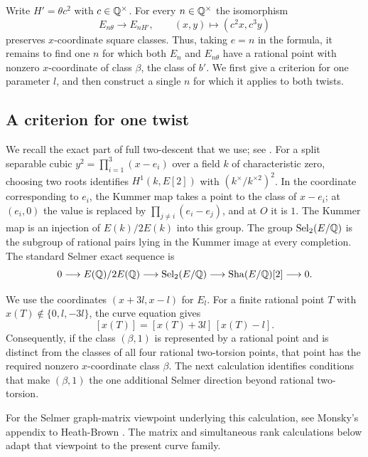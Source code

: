 Write $H'=\theta c^2$ with $c\in\mathbb Q^\times$. For every $n\in\mathbb Q^\times$
the isomorphism
\begin{equation}\label{par:twist-scaling}
 E_{n\theta}\longrightarrow E_{nH'},\qquad
 (x,y)\longmapsto(c^2x,c^3y)
\end{equation}
preserves $x$-coordinate square classes. Thus, taking $e=n$ in the
formula, it remains to find one $n$ for which both $E_n$ and
$E_{n\theta}$ have a rational point with nonzero $x$-coordinate of class
$\beta$, the class of $b'$. We first give a criterion for one parameter
$l$, and then construct a single $n$ for which it applies to both twists.

\subsection{A criterion for one twist}

We recall the exact part of full two-descent that we use; see
\cite[Chapter~X, Proposition~1.4, p.~315]{Silverman2009}. For a split
separable cubic $y^2=\prod_{i=1}^3(x-e_i)$ over a field $k$ of
characteristic zero, choosing two roots identifies
$H^1(k,E[2])$ with $(k^\times/k^{\times2})^2$. In the coordinate
corresponding to $e_i$, the Kummer map takes a point to the class
of $x-e_i$; at $(e_i,0)$ the value is replaced by
$\prod_{j\ne i}(e_i-e_j)$, and at $O$ it is $1$.
The Kummer map is an injection of $E(k)/2E(k)$ into this group.
The group $\operatorname{Sel}_2(E/\mathbb Q)$ is the subgroup of rational pairs lying
in the Kummer image at every completion. The standard Selmer exact
sequence \cite[Chapter~X, Theorem~4.2, p.~333]{Silverman2009} is
\begin{equation}\label{par:selmer-exact-sequence}
 0\longrightarrow E(\mathbb Q)/2E(\mathbb Q)
 \longrightarrow\operatorname{Sel}_2(E/\mathbb Q)
 \longrightarrow\mathop{\mathrm{Sha}}(E/\mathbb Q)[2]\longrightarrow0.
\end{equation}


We use the coordinates $(x+3l,x-l)$ for $E_l$. For a finite rational
point $T$ with $x(T)\notin\{0,l,-3l\}$, the curve equation gives
\[
             [x(T)]=[x(T)+3l]\,[x(T)-l].
\]
Consequently, if the class $(\beta,1)$ is represented by a rational
point and is distinct from the classes of all four rational two-torsion
points, that point has the required nonzero $x$-coordinate class $\beta$.
The next calculation identifies conditions that make $(\beta,1)$ the
one additional Selmer direction beyond rational two-torsion.

For the Selmer graph-matrix viewpoint underlying this calculation, see
Monsky's appendix to Heath-Brown \cite[Appendix, pp.~365--370]{HeathBrown1994}.
The matrix and simultaneous rank calculations below adapt that viewpoint
to the present curve family.


